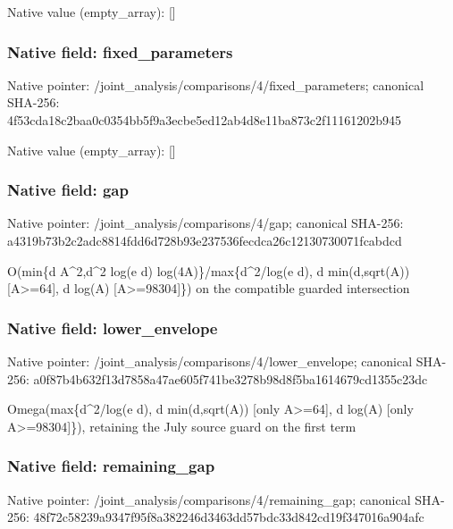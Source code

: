\documentclass[10pt,a4paper]{article}
\begin{document}
Native value (empty\_\allowbreak{}array): []

\subsubsection{Native field: fixed\_\allowbreak{}parameters}
Native pointer: /joint\_\allowbreak{}analysis/comparisons/4/fixed\_\allowbreak{}parameters; canonical SHA-256: 4f53cda18c2baa0c0354bb5f9a3ecbe5ed12ab4d8e11ba873c2f11161202b945

Native value (empty\_\allowbreak{}array): []

\subsubsection{Native field: gap}
Native pointer: /joint\_\allowbreak{}analysis/comparisons/4/gap; canonical SHA-256: a4319b73b2c2adc8814fdd6d728b93e237536fecdca26c12130730071fcabdcd

\begingroup\raggedright\sloppy O(min\{d A\textasciicircum{}2,\allowbreak{}d\textasciicircum{}2 log(e d) log(4A)\}/\allowbreak{}max\{d\textasciicircum{}2/\allowbreak{}log(e d),\allowbreak{} d min(d,\allowbreak{}sqrt(A)) [A>=\allowbreak{}64],\allowbreak{} d log(A) [A>=\allowbreak{}98304]\}) on the compatible guarded intersection\par\endgroup

\subsubsection{Native field: lower\_\allowbreak{}envelope}
Native pointer: /joint\_\allowbreak{}analysis/comparisons/4/lower\_\allowbreak{}envelope; canonical SHA-256: a0f87b4b632f13d7858a47ae605f741be3278b98d8f5ba1614679cd1355c23dc

\begingroup\raggedright\sloppy Omega(max\{d\textasciicircum{}2/\allowbreak{}log(e d),\allowbreak{} d min(d,\allowbreak{}sqrt(A)) [only A>=\allowbreak{}64],\allowbreak{} d log(A) [only A>=\allowbreak{}98304]\}),\allowbreak{} retaining the July source guard on the first term\par\endgroup

\subsubsection{Native field: remaining\_\allowbreak{}gap}
Native pointer: /joint\_\allowbreak{}analysis/comparisons/4/remaining\_\allowbreak{}gap; canonical SHA-256: 48f72c58239a9347f95f8a382246d3463dd57bdc33d842cd19f347016a904afc
\end{document}
